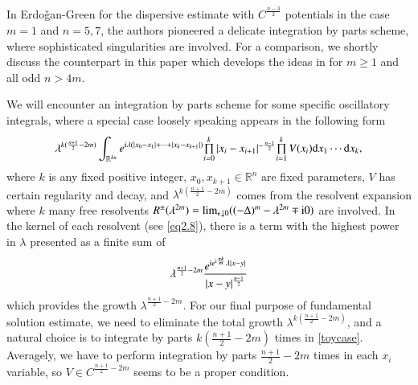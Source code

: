 \documentclass[11pt,reqno]{amsart}
\def\d{{\rm d}}
\def\i{{\rm i}}
\numberwithin{equation}{section}
\theoremstyle{definition}
\begin{document}
In Erdo\v{g}an-Green \cite{EG10} for the dispersive estimate with $C^{\frac{n-3}{2}}$ potentials in the case $m=1$ and $n=5,7$, the authors pioneered a delicate integration by parts scheme, where sophisticated singularities are involved. For a comparison, we shortly discuss the counterpart in this paper which develops the ideas in \cite{EG10} for $m\geq1$ and all odd $n>4m$.


We will encounter an integration by parts scheme for some specific oscillatory integrals, where a special case loosely speaking appears in the following form
\begin{equation}\label{toycase}
		\lambda^{k(\frac{n+1}{2}-2m)}\int_{\mathbb{R}^{kn}}e^{\mathrm{i}\lambda (|x_0-x_1|+\cdots+|x_k-x_{k+1}|)}\mbox{$\prod\limits_{i=0}^k|x_i-x_{i+1}|^{-\frac{n-1}{2}}$}\mbox{$\prod\limits_{i=1}^kV(x_i)$}\d x_1\cdots \d x_k,
\end{equation}
where $k$ is any fixed positive integer, $x_0,x_{k+1}\in\mathbb{R}^n$ are fixed parameters, $V$ has certain regularity and decay, and $\lambda^{k(\frac{n+1}{2}-2m)}$ comes from the resolvent expansion where $k$ many free resolvents $R^\pm(\lambda^{2m})=\lim_{\epsilon\downarrow0}((-\Delta)^m-\lambda^{2m}\mp \i0)$ are involved. In the kernel of each resolvent (see \eqref{eq2.8}), there is a term with the highest power in $\lambda$ presented as a finite sum of
\begin{equation*}
	\lambda^{\frac{n+1}{2}-2m}\frac{e^{\i e^{\i\frac{\pi k}{m}}\lambda|x-y|}}{|x-y|^{\frac{n-1}{2}}}
\end{equation*}
which provides the growth $\lambda^{\frac{n+1}{2}-2m}$. For our final purpose of fundamental solution estimate, we need to eliminate the total growth $\lambda^{k(\frac{n+1}{2}-2m)}$, and a natural choice is to integrate by parts $k(\frac{n+1}{2}-2m)$ times in \eqref{toycase}. Averagely, we have to perform integration by parts $\frac{n+1}{2}-2m$ times in each $x_i$ variable, so $V\in C^{\frac{n+1}{2}-2m}$ seems to be a proper condition. 
\end{document}
